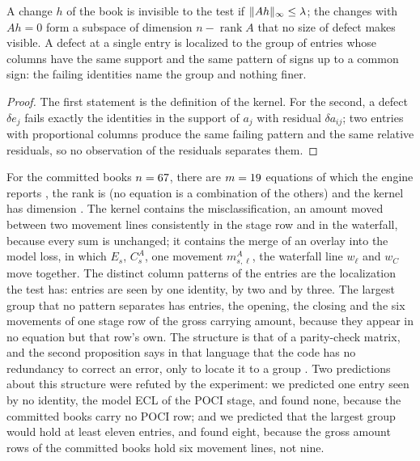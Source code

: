 \begin{proposition}
\label{prop:blind}
A change $h$ of the book is invisible to the test if $\|Ah\|_\infty\le\lambda$; the changes with $Ah=0$ form a subspace of dimension $n-\operatorname{rank}A$ that no size of defect makes visible. A defect at a single entry is localized to the group of entries whose columns have the same support and the same pattern of signs up to a common sign: the failing identities name the group and nothing finer.
\end{proposition}

\begin{proof}
The first statement is the definition of the kernel. For the second, a defect $\delta e_j$ fails exactly the identities in the support of $a_j$ with residual $\delta a_{ij}$; two entries with proportional columns produce the same failing pattern and the same relative residuals, so no observation of the residuals separates them.
\end{proof}

For the committed books $n=67{}$, there are $m=19{}$ equations of which the engine reports \esixIdentities{}, the rank is \esixRank{} (no equation is a combination of the others) and the kernel has dimension \esixKernel{}.
The kernel contains the misclassification, an amount moved between two movement lines consistently in the stage row and in the waterfall, because every sum is unchanged; it contains the merge of an overlay into the model loss, in which $E_s$, $C^{A}_{s}$, one movement $m^{A}_{s,\ell}$, the waterfall line $w_\ell$ and $w_C$ move together.
The \esixPatterns{} distinct column patterns of the \esixEntries{} entries are the localization the test has: \esixSeenOne{} entries are seen by one identity, \esixSeenTwo{} by two and \esixSeenThree{} by three.
The largest group that no pattern separates has \esixLargest{} entries, the opening, the closing and the six movements of one stage row of the gross carrying amount, because they appear in no equation but that row's own.
The structure is that of a parity-check matrix, and the second proposition says in that language that the code has no redundancy to correct an error, only to locate it to a group \citep{hamming1950}.
Two predictions about this structure were refuted by the experiment: we predicted one entry seen by no identity, the model ECL of the POCI stage, and found none, because the committed books carry no POCI row; and we predicted that the largest group would hold at least eleven entries, and found eight, because the gross amount rows of the committed books hold six movement lines, not nine.

